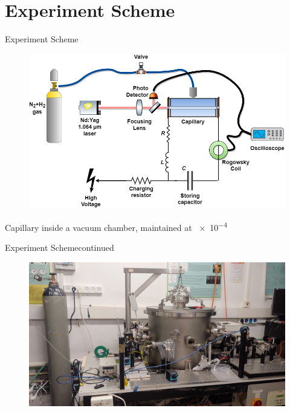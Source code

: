 \documentclass[]{beamer}
\begin{document}
\section{Experiment Scheme}
\begin{frame}{Experiment Scheme}
  \begin{figure}
    \includegraphics[width=\textwidth]{figures/methods/Laser-based ignition scheme.png}
  \end{figure}
  Capillary inside a vacuum chamber, maintained at \SI{e-4}{\torr}
\end{frame}
\begin{frame}{Experiment Scheme}{continued}
  \begin{figure}
    \includegraphics[width=\textwidth]{figures/methods/system_picture.jpg}
  \end{figure}
\end{frame}
\end{document}
